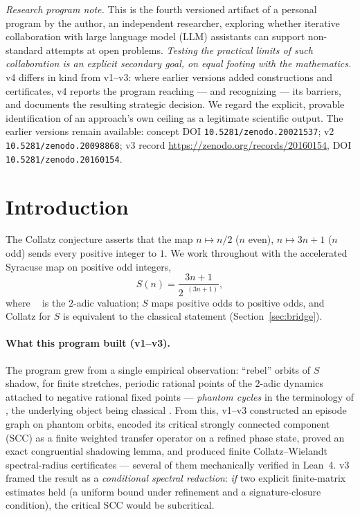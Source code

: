 \documentclass[11pt,a4paper]{article}
\theoremstyle{definition}
\DeclareMathOperator{\nutwo}{\nu_2}
\begin{document}
\noindent\textit{Research program note.} This is the fourth versioned
artifact of a personal program by the author, an independent researcher,
exploring whether iterative collaboration with large language model (LLM)
assistants can support non-standard attempts at open problems.
\emph{Testing the practical limits of such collaboration is an explicit
secondary goal, on equal footing with the mathematics.} v4 differs in kind
from v1--v3: where earlier versions added constructions and certificates,
v4 reports the program reaching --- and recognizing --- its barriers, and
documents the resulting strategic decision. We regard the explicit,
provable identification of an approach's own ceiling as a legitimate
scientific output. The earlier versions remain available: concept DOI
\texttt{10.5281/zenodo.20021537}; v2 \texttt{10.5281/zenodo.20098868}; v3
record \url{https://zenodo.org/records/20160154}, DOI
\texttt{10.5281/zenodo.20160154}.

\tableofcontents

\section{Introduction}
\label{sec:intro}

The Collatz conjecture asserts that the map $n \mapsto n/2$ ($n$ even),
$n \mapsto 3n+1$ ($n$ odd) sends every positive integer to $1$. We work
throughout with the accelerated Syracuse map on positive odd integers,
\[
  S(n) = \frac{3n+1}{2^{\nutwo(3n+1)}},
\]
where $\nutwo$ is the $2$-adic valuation; $S$ maps positive odds to
positive odds, and Collatz for $S$ is equivalent to the classical
statement (Section~\ref{sec:bridge}).

\paragraph{What this program built (v1--v3).}
The program grew from a single empirical observation: ``rebel'' orbits of
$S$ shadow, for finite stretches, periodic rational points of the $2$-adic
dynamics attached to negative rational fixed points --- \emph{phantom
cycles} in the terminology of \cite{chang2026}, the underlying object
being classical \cite{lagarias1985}. From this, v1--v3 constructed an
episode graph on phantom orbits, encoded its critical strongly connected
component (SCC) as a finite weighted transfer operator on a refined phase
state, proved an exact congruential shadowing lemma, and produced finite
Collatz--Wielandt spectral-radius certificates --- several of them
mechanically verified in Lean~4. v3 \cite{borgatta_v3} framed the result
as a \emph{conditional spectral reduction}: \emph{if} two explicit
finite-matrix estimates held (a uniform bound under refinement and a
signature-closure condition), the critical SCC would be subcritical.
\end{document}
